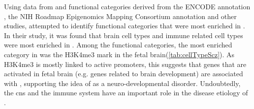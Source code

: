 	Using data from \citet{Ripke2014} and functional categories derived from the ENCODE annotation \citep{ENCODEProjectConsortium2012}, the NIH Roadmap Epigenomics Mapping Consortium annotation \citep{Bernstein2010} and other studies, \citet{Finucane2015} attempted to identify functional categories that were most enriched in .
	In their study, it was found that brain cell types and immune related cell types were most enriched in .
	Among the functional categories, the most enriched category in  was the H3K4me3 mark in the fetal brain(\cref{tab:cellTypeScz}). 
	As H3K4me3 is mostly linked to active promoters, this suggests that genes that are activated in fetal brain (e.g. genes related to brain development) are associated with , supporting the idea of  as a neuro-developmental disorder. 
	Undoubtedly, the \gls{cns} and the immune system have an important role in the disease etiology of . 
		
